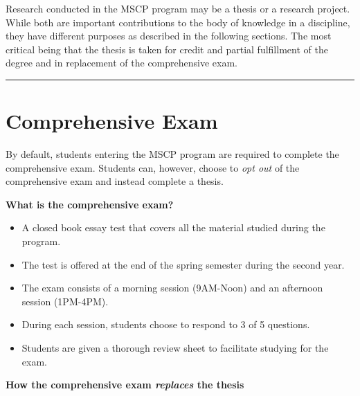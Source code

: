 \documentclass[openany]{book}
\providecommand{\tightlist}{%
  \setlength{\itemsep}{0pt}\setlength{\parskip}{0pt}}
\begin{document}
Research conducted in the MSCP program may be a thesis or a research project. While both are important contributions to the body of knowledge in a discipline, they have different purposes as described in the following sections. The most critical being that the thesis is taken for credit and partial fulfillment of the degree and in replacement of the comprehensive exam.

\begin{center}\rule{0.5\linewidth}{0.5pt}\end{center}

\hypertarget{comprehensive-exam}{%
\section{Comprehensive Exam}\label{comprehensive-exam}}

By default, students entering the MSCP program are required to complete the comprehensive exam. Students can, however, choose to \emph{opt out} of the comprehensive exam and instead complete a thesis.

\textbf{What is the comprehensive exam?}

\begin{itemize}
\tightlist
\item
  A closed book essay test that covers all the material studied during the program.\\
\item
  The test is offered at the end of the spring semester during the second year.
\item
  The exam consists of a morning session (9AM-Noon) and an afternoon session (1PM-4PM).
\item
  During each session, students choose to respond to 3 of 5 questions.
\item
  Students are given a thorough review sheet to facilitate studying for the exam.
\end{itemize}

\textbf{How the comprehensive exam \emph{replaces} the thesis}
\end{document}
